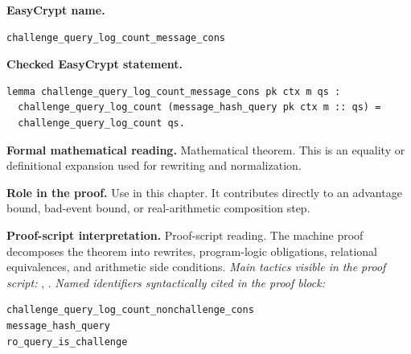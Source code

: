\begin{formaltheorem}
\noindent\textbf{EasyCrypt name.}
\begin{lstlisting}[language=EasyCrypt,basicstyle=\ttfamily\scriptsize]
challenge_query_log_count_message_cons
\end{lstlisting}
\noindent\textbf{Checked EasyCrypt statement.}
\begin{lstlisting}[language=EasyCrypt,basicstyle=\ttfamily\scriptsize]
lemma challenge_query_log_count_message_cons pk ctx m qs :
  challenge_query_log_count (message_hash_query pk ctx m :: qs) =
  challenge_query_log_count qs.
\end{lstlisting}
\noindent\textbf{Formal mathematical reading.}
Mathematical theorem. This is an equality or definitional expansion used for rewriting and normalization.

\noindent\textbf{Role in the proof.}
Use in this chapter. It contributes directly to an advantage bound, bad-event bound, or real-arithmetic composition step.

\noindent\textbf{Proof-script interpretation.}
Proof-script reading. The machine proof decomposes the theorem into rewrites, program-logic obligations, relational equivalences, and arithmetic side conditions.
\emph{Main tactics visible in the proof script:} , .
\emph{Named identifiers syntactically cited in the proof block:}
\begin{lstlisting}[language=EasyCrypt,basicstyle=\ttfamily\scriptsize]
challenge_query_log_count_nonchallenge_cons
message_hash_query
ro_query_is_challenge
\end{lstlisting}

\end{formaltheorem}


